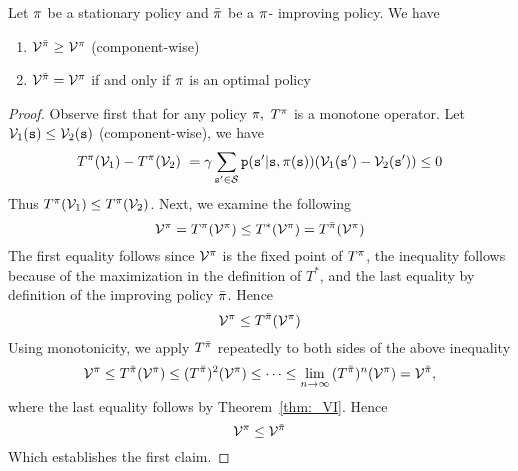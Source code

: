 \begin{lemma}
Let $\pi$ be a stationary policy and $\bar{\pi}$ be a
$\pi$- improving policy.
%
We have
\begin{enumerate}
    \item ${\mathcal{V}^{\bar {\pi} }} \ge {\mathcal{V}^\pi}$ (component-wise)
    \item ${\mathcal{V}^{\bar {\pi} }} = {\mathcal{V}^\pi }$ if and only if $\pi$ is an optimal policy
\end{enumerate}
\end{lemma}

\begin{proof} Observe first that for any policy $\pi, $ $T_{}^\pi $ 
is a monotone operator. Let ${\mathcal{V}_1}({\tt s}) \le {\mathcal{V}_2}({\tt s})$ (component-wise), we have
\[T^\pi (\mathcal{V}_1) - T^\pi (\mathcal{V}_2)\ =
\gamma\sum_{{\tt s}'\in\mathcal{S}}{\tt p}({\tt s}'|{\tt s},\pi({\tt s}))(\mathcal{V}_1({\tt s}')-\mathcal{V}_2({\tt s}')) \le 0\]
Thus $T^\pi (\mathcal{V}_1) \le T^\pi (\mathcal{V}_2)$. Next, we examine the following
\[{\mathcal{V}^\pi } = T_{}^\pi ({\mathcal{V}^\pi }) \le T_{}^*({\mathcal{V}^\pi }) = T_{}^{\bar {\pi} }({\mathcal{V}^\pi })\]
The first equality follows since ${\mathcal{V}^\pi}$ is the
fixed point of $T^{\pi}$, the inequality follows because
of the maximization in the definition of  $T^*$, and the last
equality by definition of the improving policy $\bar {\pi} $. Hence
\[{\mathcal{V}^\pi } \le T_{}^{\bar {\pi} }({\mathcal{V}^\pi })\]
Using monotonicity, we apply $T^{\bar {\pi} }$
repeatedly to both sides of the above inequality
\begin{equation}\label{eq:PI_monotonicity_proof}
  {\mathcal{V}^\pi} \le T_{}^{\bar {\pi} }({\mathcal{V}^\pi }) \le {(T_{}^{\bar {\pi}})^2}({\mathcal{V}^\pi }) \le  \cdots  \le \mathop {\lim }\limits_{n \to \infty } {(T_{}^{\bar {\pi} })^n}({\mathcal{V}^\pi }) = {\mathcal{V}^{\bar {\pi} }},  
\end{equation}
where the last equality follows by Theorem~\ref{thm:_VI}. Hence
\[{\mathcal{V}^\pi } \le {\mathcal{V}^{\bar {\pi}}}\]
Which establishes the first claim.


\end{proof}
